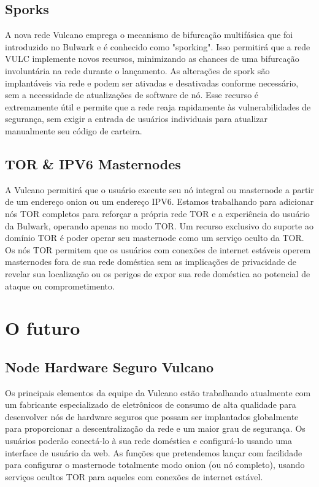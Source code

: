 \documentclass[A4paper, 12pt]{article}
\begin{document}
\subsection{Sporks}
A nova rede Vulcano emprega o mecanismo de bifurcação multifásica que foi introduzido no Bulwark e é conhecido como "sporking". Isso permitirá que a rede VULC implemente novos recursos, minimizando as chances de uma bifurcação involuntária na rede durante o lançamento. As alterações de spork são implantáveis via rede e podem ser ativadas e desativadas conforme necessário, sem a necessidade de atualizações de software de nó.  Esse recurso é extremamente útil e permite que a rede reaja rapidamente às vulnerabilidades de segurança, sem exigir a entrada de usuários individuais para atualizar manualmente seu código de carteira.

\subsection{TOR \& IPV6 Masternodes}
A Vulcano permitirá que o usuário execute seu nó integral ou masternode a partir de um endereço onion ou um endereço IPV6.  Estamos trabalhando para adicionar nós TOR completos para reforçar a própria rede TOR e a experiência do usuário da Bulwark, operando apenas no modo TOR. Um recurso exclusivo do suporte ao domínio TOR é poder operar seu masternode como um serviço oculto da TOR. Os nós TOR permitem que os usuários com conexões de internet estáveis operem masternodes fora de sua rede doméstica sem as implicações de privacidade de revelar sua localização ou os perigos de expor sua rede doméstica ao potencial de ataque ou comprometimento.

\section{O futuro}
\subsection{Node Hardware Seguro Vulcano}
Os principais elementos da equipe da Vulcano estão trabalhando atualmente com um fabricante especializado de eletrônicos de consumo de alta qualidade para desenvolver nós de hardware seguros que possam ser implantados globalmente para proporcionar a descentralização da rede e um maior grau de segurança. Os usuários poderão conectá-lo à sua rede doméstica e configurá-lo usando uma interface de usuário da web. As funções que pretendemos lançar com facilidade para configurar o masternode totalmente modo onion (ou nó completo), usando serviços ocultos TOR para aqueles com conexões de internet estável.
\end{document}
